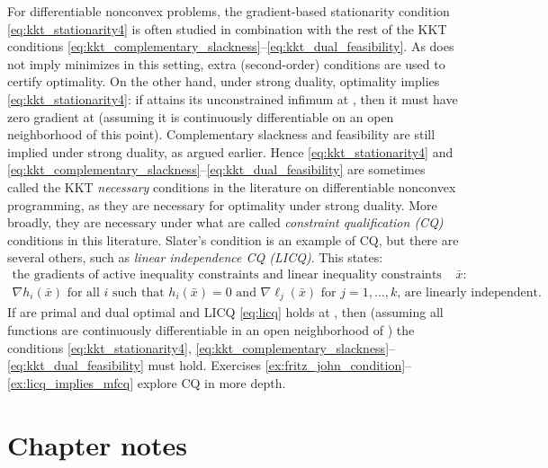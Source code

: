 For differentiable nonconvex problems, the gradient-based stationarity condition
\eqref{eq:kkt_stationarity4} is often studied in combination with the rest of
the KKT conditions
\eqref{eq:kkt_complementary_slackness}--\eqref{eq:kkt_dual_feasibility}. As
 does not imply
 minimizes  in this
setting, extra (second-order) conditions are used to certify optimality. On the
other hand, under strong duality, optimality implies
\eqref{eq:kkt_stationarity4}: if  attains
its unconstrained infimum at , then it must have zero gradient
at  (assuming it is continuously differentiable on an open
neighborhood of this point). Complementary slackness and feasibility are still
implied under strong duality, as argued earlier. Hence
\eqref{eq:kkt_stationarity4} and
\eqref{eq:kkt_complementary_slackness}--\eqref{eq:kkt_dual_feasibility} are
sometimes called the KKT \emph{necessary} conditions in the literature on
differentiable nonconvex programming, as they are necessary for optimality under
strong duality. More broadly, they are necessary under what are called
\emph{constraint qualification (CQ)} conditions in this literature. Slater's
condition is an example of CQ, but there are several others, such as
\emph{linear independence CQ (LICQ)}. This states:   
\begin{multline}
\label{eq:licq} 
\text{the gradients of active inequality constraints and linear
  inequality constraints at $\bar{x}$:} \\ \text{$\nabla h_i(\bar{x})$ for all 
  $i$ such that $h_i(\bar{x}) = 0$ and $\nabla \ell_j(\bar{x})$ for $j =
  1,\dots,k$, are linearly independent.}   
\end{multline}
If  are primal and dual optimal and LICQ
\eqref{eq:licq} holds at , then (assuming all functions are
continuously differentiable in an open neighborhood of ) the
conditions \eqref{eq:kkt_stationarity4},
\eqref{eq:kkt_complementary_slackness}--\eqref{eq:kkt_dual_feasibility} must
hold. Exercises \ref{ex:fritz_john_condition}--\ref{ex:licq_implies_mfcq}
explore CQ in more depth.


\SkipTocEntry\section*{Chapter notes}

